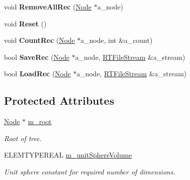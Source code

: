 \begin{DoxyCompactItemize}
\item 
\hypertarget{class_r_tree_a5045d833566114335162fda10d58081d}{void {\bfseries \-Remove\-All\-Rec} (\hyperlink{struct_r_tree_1_1_node}{\-Node} $\ast$a\-\_\-node)}\label{class_r_tree_a5045d833566114335162fda10d58081d}

\item 
\hypertarget{class_r_tree_a2508b9d85f5b5f553b313356c05c6e0c}{void {\bfseries \-Reset} ()}\label{class_r_tree_a2508b9d85f5b5f553b313356c05c6e0c}

\item 
\hypertarget{class_r_tree_a22345d494c1d6bf907444f17802bd864}{void {\bfseries \-Count\-Rec} (\hyperlink{struct_r_tree_1_1_node}{\-Node} $\ast$a\-\_\-node, int \&a\-\_\-count)}\label{class_r_tree_a22345d494c1d6bf907444f17802bd864}

\item 
\hypertarget{class_r_tree_a53a8af8a04a9a4a9eb93a6a0792fea95}{bool {\bfseries \-Save\-Rec} (\hyperlink{struct_r_tree_1_1_node}{\-Node} $\ast$a\-\_\-node, \hyperlink{class_r_t_file_stream}{\-R\-T\-File\-Stream} \&a\-\_\-stream)}\label{class_r_tree_a53a8af8a04a9a4a9eb93a6a0792fea95}

\item 
\hypertarget{class_r_tree_aa432ad1d5dfc151c1f8eac388af41968}{bool {\bfseries \-Load\-Rec} (\hyperlink{struct_r_tree_1_1_node}{\-Node} $\ast$a\-\_\-node, \hyperlink{class_r_t_file_stream}{\-R\-T\-File\-Stream} \&a\-\_\-stream)}\label{class_r_tree_aa432ad1d5dfc151c1f8eac388af41968}

\end{DoxyCompactItemize}
\subsection*{\-Protected \-Attributes}
\begin{DoxyCompactItemize}
\item 
\hypertarget{class_r_tree_a5028f4e28918519bc70cb1f615316582}{\hyperlink{struct_r_tree_1_1_node}{\-Node} $\ast$ \hyperlink{class_r_tree_a5028f4e28918519bc70cb1f615316582}{m\-\_\-root}}\label{class_r_tree_a5028f4e28918519bc70cb1f615316582}

\begin{DoxyCompactList}\small\item\em \-Root of tree. \end{DoxyCompactList}\item 
\hypertarget{class_r_tree_af26d4beb8ce3a381ee75eabeec4727e3}{\-E\-L\-E\-M\-T\-Y\-P\-E\-R\-E\-A\-L \hyperlink{class_r_tree_af26d4beb8ce3a381ee75eabeec4727e3}{m\-\_\-unit\-Sphere\-Volume}}\label{class_r_tree_af26d4beb8ce3a381ee75eabeec4727e3}

\begin{DoxyCompactList}\small\item\em \-Unit sphere constant for required number of dimensions. \end{DoxyCompactList}\end{DoxyCompactItemize}



